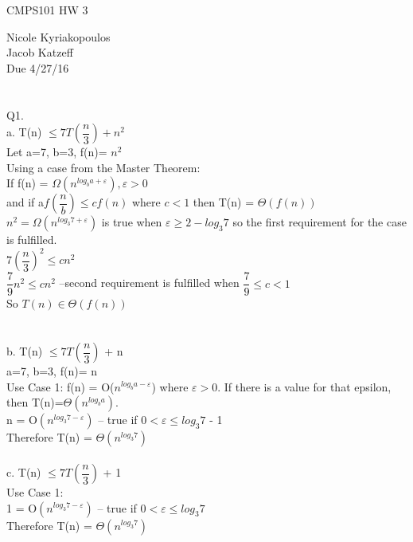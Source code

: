 \documentclass[10pt,a4paper]{article}
\begin{document}
\begin{center}
CMPS101 HW 3

\end{center}
Nicole Kyriakopoulos \\
Jacob Katzeff \\
Due 4/27/16 \\
\\
\\
Q1. \\
a.  T(n) $\leq 7T(\dfrac{n}{3}) + n^{2}$ \\
	Let a=7, b=3, f(n)= $n^{2}$ \\
	 Using a case from the Master Theorem: \\
	 If f(n) = $\Omega(n^{log_{b}a + \varepsilon}), \varepsilon>0$ \\
	 and if a$f(\dfrac{n}{b})\leq cf(n) $ where $c<1$ then T(n) = $\Theta(f(n))$ \\
	 $n^{2} = \Omega (n^{log_{3}7 + \varepsilon} ) $ is true when  $\varepsilon \geq 2 - log_{3}7$ so the first requirement for the case is fulfilled.\\
	 $ 7(\dfrac{n}{3})^{2}\leq cn^{2}$ \\
	 $\dfrac{7}{9}n^{2} \leq cn^{2}$ --second requirement is fulfilled when $\dfrac{7}{9} \leq c < 1$ \\
	 So $T(n) \in \Theta(f(n))$\\
\\	 
\\ 
b. T(n) $\leq 7T(\dfrac{n}{3})$ + n \\
	a=7, b=3, f(n)= n \\
	Use Case 1: f(n) = O($n^{log_{b}a - \varepsilon}$) where $\varepsilon >$0. If there is a value for that epsilon, then T(n)=$\Theta(n^{log_{b}a})$. \\
	n = O$(n^{log_{3}7 - \varepsilon})$  -- true if $0< \varepsilon \leq log_{3}7$ - 1 \\
	Therefore T(n) = $\Theta(n^{log_{3}7})$
	\\
	\\
c. T(n) $\leq 7T(\dfrac{n}{3})$ + 1\\
	Use Case 1: \\
	1 = O$(n^{log_{3}7 - \varepsilon})$  -- true if $0< \varepsilon \leq log_{3}7$ \\
	Therefore T(n) = $\Theta(n^{log_{3}7})$ \\
	
\end{document}
